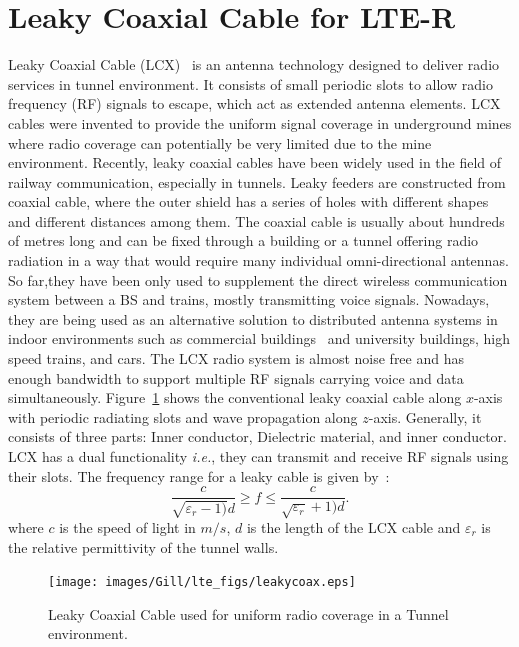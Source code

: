 \section{Leaky Coaxial Cable for LTE-R}
Leaky Coaxial Cable (LCX)~\cite{n1974leaky} is an antenna technology designed to deliver radio services in tunnel environment. It consists of small periodic slots to allow radio frequency (RF) signals to escape, which act as extended antenna elements. LCX cables were invented to provide the uniform signal coverage in underground mines where radio coverage can potentially be very limited due to the mine environment. Recently, leaky coaxial cables have been widely used in the field of railway communication, especially in tunnels. Leaky feeders are
constructed from coaxial cable, where the outer shield has a series of holes with different shapes and different distances among them. The coaxial cable is usually about hundreds of metres long and can be fixed through a building or a tunnel offering radio radiation in a way that would require many individual omni-directional antennas. So far,they have been only used to supplement the direct wireless communication system between a BS and trains, mostly transmitting voice signals. Nowadays, they are being used as an alternative solution to distributed antenna systems in indoor environments such as commercial buildings~\cite{motley1983directed,saleh1987distributed} and university buildings, high speed trains, and cars. The LCX radio system is almost noise free and has enough bandwidth to support multiple RF signals carrying voice and data simultaneously. Figure~\ref{fig:leakcoax} shows the conventional leaky coaxial cable along $x$-axis with periodic radiating slots and wave propagation along $z$-axis. Generally, it consists of three parts: Inner conductor, Dielectric material, and inner conductor. LCX has a dual functionality \textit{i.e.}, they can transmit and receive RF signals using their slots. The frequency range for a leaky cable is given by~\cite{cao1999radio}:
\begin{equation}
\dfrac{c}{\sqrt{\varepsilon_r-1)}d}\geq f \leq \dfrac{c}{\sqrt{\varepsilon_r}+1)d}.
\end{equation}
where $c$ is the speed of light in $m/s$, $d$ is the length of the LCX cable and $\varepsilon_r$ is the relative permittivity of the tunnel walls.
\begin{figure}[!ht]
\centering
\texttt{[image: images/Gill/lte\_figs/leakycoax.eps]} 
\caption{Leaky Coaxial Cable used for uniform radio coverage in a Tunnel environment.~\cite{arlter10}}
\label{fig:leakcoax}
\end{figure}

